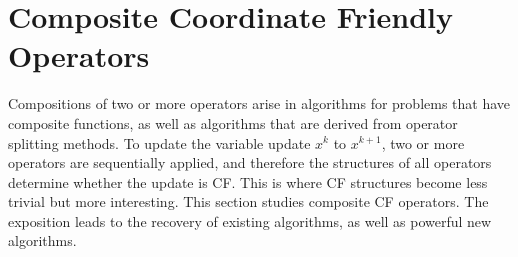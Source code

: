 \section{Composite Coordinate Friendly Operators}\label{sec:comp-cuf}
Compositions of two or more operators arise in  algorithms for problems that have composite functions, as well as  algorithms that are derived from operator splitting methods. To update the variable update $x^k$ to $x^{k+1}$, two or more operators are sequentially applied, and therefore the structures of all  operators  determine whether the update is CF. This is where CF structures become less trivial but more interesting. This section studies composite CF operators. The exposition leads to the recovery of existing algorithms, as well as powerful new algorithms.

